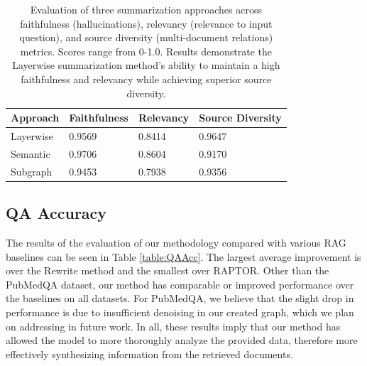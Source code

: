 \documentclass[11pt]{article}
\theoremstyle{definition}
\begin{document}
\begin{table}[!ht]
\begin{center}
    \begin{tabular}{p{1.5cm}|p{1.7cm}|p{1.5cm}|p{1.5cm}}
    \hline
     Approach & Faithfulness & Relevancy & Source Diversity\\
     \hline
     Layerwise & 0.9569 & 0.8414 & 0.9647 \\
     Semantic & 0.9706 & 0.8604 & 0.9170 \\
     Subgraph & 0.9453 & 0.7938 & 0.9356 \\
     \hline
    \end{tabular}
\end{center}
\caption{Evaluation of three summarization approaches across faithfulness (hallucinations), relevancy (relevance to input question), and source diversity (multi-document relations) metrics. Scores range from 0-1.0. Results demonstrate the Layerwise summarization method's ability to maintain a high faithfulness and relevancy while achieving superior source diversity. }
\label{table:GraphSum}
\end{table}

\subsection{QA Accuracy}
 The results of the evaluation of our methodology compared with various RAG baselines can be seen in Table \ref{table:QAAcc}. The largest average improvement is over the Rewrite method and the smallest over RAPTOR. Other than the PubMedQA dataset, our method has comparable or improved performance over the baselines on all datasets. For PubMedQA, we believe that the slight drop in performance is due to insufficient denoising in our created graph, which we plan on addressing in future work. In all, these results imply that our method has allowed the model to more thoroughly analyze the provided data, therefore more effectively synthesizing information from the retrieved documents. 
\end{document}
